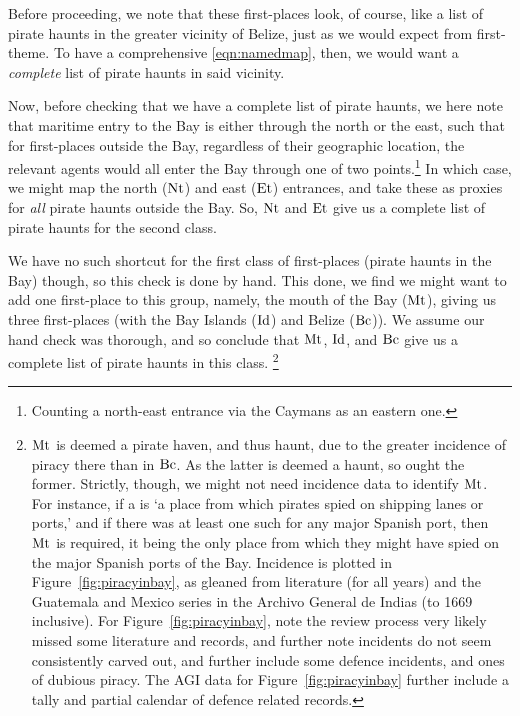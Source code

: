 			Before proceeding, we note that these first-places look, of course, like a list of pirate haunts in the greater vicinity of Belize, just as we would expect from first-theme. To have a comprehensive \ref{eqn:namedmap}, then, we would want a \emph{complete} list of pirate haunts in said vicinity.
			
			Now, before checking that we have a complete list of pirate haunts, we here note that maritime entry to the Bay is either through the north or the east, such that for first-places outside the Bay, regardless of their geographic location, the relevant agents would all enter the Bay through one of two points.\footnote{Counting a north-east entrance via the Caymans as an eastern one.} In which case, we might map the north (\(\operatorname{Nt}\)) and east (\(\operatorname{Et}\)) entrances, and take these as proxies for \emph{all} pirate haunts outside the Bay. So, \(\operatorname{Nt}\) and \(\operatorname{Et}\) give us a complete list of pirate haunts for the second class.
		
			We have no such shortcut for the first class of first-places (pirate haunts in the Bay) though, so this check is done by hand. This done, we find we might want to add one first-place to this group, namely, the mouth of the Bay (\(\operatorname{Mt}\)), giving us three first-places (with the Bay Islands (\(\operatorname{Id}\)) and Belize (\(\operatorname{Bc}\))). We assume our hand check was thorough, and so conclude that \(\operatorname{Mt}\), \(\operatorname{Id}\), and \(\operatorname{Bc}\) give us a complete list of pirate haunts in this class.%
			\footnote{\(\operatorname{Mt}\) is deemed a pirate haven, and thus haunt, due to the greater incidence of piracy there than in \(\operatorname{Bc}\). As the latter is deemed a haunt, so ought the former. Strictly, though, we might not need incidence data to identify \(\operatorname{Mt}\). For instance, if a  is `a place from which pirates spied on shipping lanes or ports,' and if there was at least one such for any major Spanish port, then \(\operatorname{Mt}\) is required, it being the only place from which they might have spied on the major Spanish ports of the Bay. Incidence is plotted in Figure~\ref{fig:piracyinbay}, as gleaned from literature (for all years) and the Guatemala and Mexico series in the Archivo General de Indias (to 1669 inclusive). For Figure~\ref{fig:piracyinbay}, note the review process very likely missed some literature and records, and further note incidents do not seem consistently carved out, and further include some defence incidents, and ones of dubious piracy. The AGI data for Figure~\ref{fig:piracyinbay} further include a tally and partial calendar of defence related records.}
			
